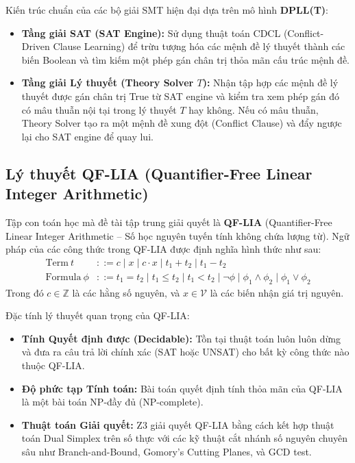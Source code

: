 Kiến trúc chuẩn của các bộ giải SMT hiện đại dựa trên mô hình \textbf{DPLL(T)}:
\begin{itemize}
    \item \textbf{Tầng giải SAT (SAT Engine):} Sử dụng thuật toán CDCL (Conflict-Driven Clause Learning) để trừu tượng hóa các mệnh đề lý thuyết thành các biến Boolean và tìm kiếm một phép gán chân trị thỏa mãn cấu trúc mệnh đề.
    \item \textbf{Tầng giải Lý thuyết (Theory Solver $T$):} Nhận tập hợp các mệnh đề lý thuyết được gán chân trị True từ SAT engine và kiểm tra xem phép gán đó có mâu thuẫn nội tại trong lý thuyết $T$ hay không. Nếu có mâu thuẫn, Theory Solver tạo ra một mệnh đề xung đột (Conflict Clause) và đẩy ngược lại cho SAT engine để quay lui.
\end{itemize}

\subsection{Lý thuyết QF-LIA (Quantifier-Free Linear Integer Arithmetic)}
Tập con toán học mà đề tài tập trung giải quyết là \textbf{QF-LIA} (Quantifier-Free Linear Integer Arithmetic -- Số học nguyên tuyến tính không chứa lượng từ). Ngữ pháp của các công thức trong QF-LIA được định nghĩa hình thức như sau:
\begin{align}
\text{Term} \ t &::= c \mid x \mid c \cdot x \mid t_1 + t_2 \mid t_1 - t_2 \\
\text{Formula} \ \phi &::= t_1 = t_2 \mid t_1 \le t_2 \mid t_1 < t_2 \mid \neg \phi \mid \phi_1 \land \phi_2 \mid \phi_1 \lor \phi_2
\end{align}
Trong đó $c \in \mathbb{Z}$ là các hằng số nguyên, và $x \in \mathcal{V}$ là các biến nhận giá trị nguyên.

Đặc tính lý thuyết quan trọng của QF-LIA:
\begin{itemize}
    \item \textbf{Tính Quyết định được (Decidable):} Tồn tại thuật toán luôn luôn dừng và đưa ra câu trả lời chính xác (SAT hoặc UNSAT) cho bất kỳ công thức nào thuộc QF-LIA.
    \item \textbf{Độ phức tạp Tính toán:} Bài toán quyết định tính thỏa mãn của QF-LIA là một bài toán NP-đầy đủ (NP-complete).
    \item \textbf{Thuật toán Giải quyết:} Z3 giải quyết QF-LIA bằng cách kết hợp thuật toán Dual Simplex trên số thực với các kỹ thuật cắt nhánh số nguyên chuyên sâu như Branch-and-Bound, Gomory's Cutting Planes, và GCD test.
\end{itemize}

